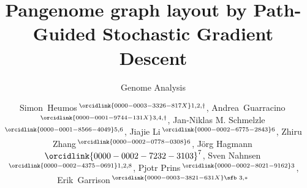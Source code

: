 \documentclass{bioinfo}
\theoremstyle{definition}
\begin{document}

    \subtitle{Genome Analysis}

    \title[Pangenome graph layout by Path-Guided Stochastic Gradient Descent]{Pangenome graph layout by Path-Guided Stochastic Gradient Descent}
    
	\author[Heumos, Guarracino \textit{et~al}.]{
        Simon~Heumos\,$^{\orcidlink{0000-0003-3326-817X}1,2,\dagger}$,
        Andrea~Guarracino\,$^{\orcidlink{0000-0001-9744-131X}3,4,\dagger}$,
        Jan-Niklas M. Schmelzle\,$^{\orcidlink{0000-0001-8566-4049}5,6}$,
        Jiajie Li\,$^{\orcidlink{0000-0002-6775-2843}6}$,
        Zhiru Zhang\,$^{\orcidlink{0000-0002-0778-0308}6}$,
        Jörg Hagmann\,${\orcidlink{0000-0002-7232-3103}^7}$,
        Sven Nahnsen\,$^{\orcidlink{0000-0002-4375-0691}1,2,8}$,
        Pjotr Prins\,$^{\orcidlink{0000-0002-8021-9162}3}$,
        Erik~Garrison\,$^{\orcidlink{0000-0003-3821-631X}\text{\sfb 3},*}$
    }

    \address{
        $^1$Quantitative Biology Center (QBiC), University of Tübingen, Tübingen 72076, Germany \\
        $^2$Biomedical Data Science, Department of Computer Science, University of Tübingen, Tübingen 72076, Germany \\
        $^3$Department of Genetics, Genomics and Informatics, University of Tennessee Health Science Center, Memphis, TN 38163, USA \\
        $^4$Genomics Research Centre, Human Technopole, Milan 20157, Italy \\
        $^5$Department of Computer Engineering, School of Computation, Information and Technology (CIT), Technical University of Munich, Munich 80333, Germany \\
        $^6$School of Electrical and Computer Engineering, Cornell University, Ithaca, NY 14853, USA \\
        $^7$Computomics GmbH, Eisenbahnstr. 1, 72072 Tübingen, Germany \\
        $^8$M3 Research Center, University Hospital Tübingen, 72076 Tübingen, Germany \\
    }
\end{document}
